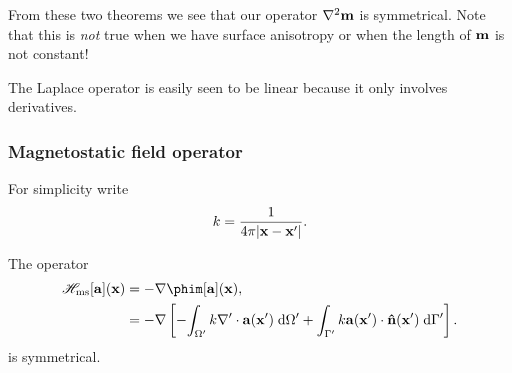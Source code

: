 From these two theorems we see that our operator $\nabla^2 \mathbf{m}$ is symmetrical. Note that this is \emph{not} true when we have surface anisotropy or when the length of $\mathbf{m}$ is not constant!

The Laplace operator is easily seen to be linear because it only involves derivatives.


\subsubsection{Magnetostatic field operator}

For simplicity write
\begin{equation}
  k = \frac{1}{4\pi \lvert \mathbf{x} - \mathbf{x}' \rvert}.
\end{equation}

\begin{theorem}
  The operator
  \begin{equation}
    \begin{aligned}
      \hmsop [\av](\xv) &= - \grad \phim[\av](\xv), \\
      &= -\grad \left[-\intd[\magd']{\knl \nabla' \cdot \av(\xv')}
          + \intd[\boundd']{\knl \av(\xv') \cdot \nv(\xv')} \right].
    \end{aligned}
  \end{equation}
  is symmetrical.
\end{theorem}

